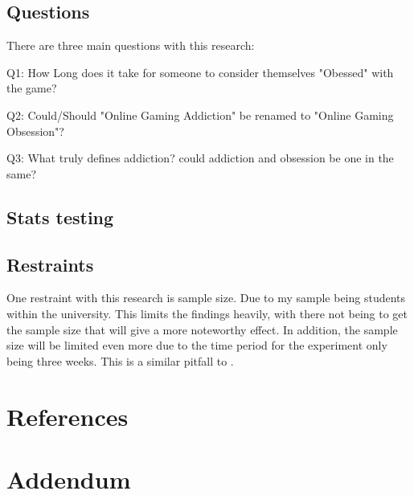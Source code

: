 \documentclass[conference]{IEEEtran}
\begin{document}
\subsection{Questions}
There are three main questions with this research:

Q1: How Long does it take for someone to consider themselves "Obessed" with the game?

Q2: Could/Should "Online Gaming Addiction" be renamed to "Online Gaming Obsession"?

Q3: What truly defines addiction? could addiction and obsession be one in the same?\\
\subsection {Stats testing}

\subsection {Restraints}
One restraint with this research is sample size. Due to my sample being students within the university. This limits the findings heavily, with there not being to get the sample size that will give a more noteworthy effect. In addition, the sample size will be limited even more due to the time period for the experiment only being three weeks. This is a similar pitfall to \cite{Naaj2021}.\\



\section*{References}





\section {Addendum}
\end{document}
